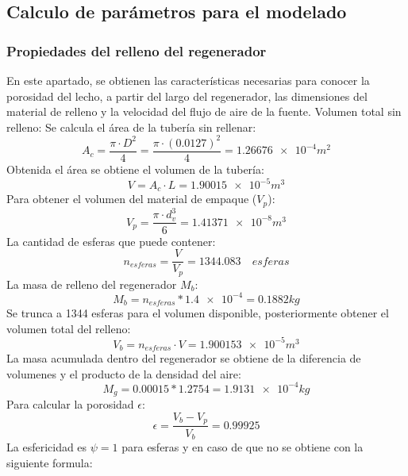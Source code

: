 \documentclass[12pt,letterpaper,final]{article}%
\begin{document}
\subsection{Calculo de parámetros para el modelado}
\subsubsection{Propiedades del relleno del regenerador}
En este apartado, se obtienen las características necesarias para conocer la porosidad del lecho, a partir del largo del regenerador,  las dimensiones del material de relleno y la velocidad del flujo de aire de la fuente. 
 \newline
 Volumen total sin relleno:
 Se calcula el área de la tubería sin rellenar:
 \begin{equation*}
 	A_c= \frac{\pi \cdot D^2}{4} = \frac{\pi \cdot (0.0127)^2}{4} =\num{1.26676e-4} m^2
 \end{equation*}
 Obtenida el área se obtiene el volumen de la tubería:
 \begin{equation*}
 	V=A_c \cdot L = \num{1.90015e-5} m^3
 \end{equation*}
Para obtener el volumen del material de empaque ($V_p$):
\begin{equation*}
	V_p= \frac{\pi \cdot d_v^3}{6} = \num{1.41371e-8} m^3
\end{equation*}
La cantidad de esferas que puede contener:
\begin{equation*}
	n_{esferas}= \frac{V}{V_p} = 1344.083 \quad esferas
\end{equation*}
La masa de relleno del regenerador $M_b$:
\begin{equation*}
	M_{b}= n_{esferas}*\num{1.4e-4} = 0.1882 kg 
\end{equation*}
Se trunca a 1344 esferas para el volumen disponible, posteriormente obtener el volumen total del relleno:
\begin{equation*}
	V_b= n_{esferas} \cdot V = \num{1.900153e-5} m^3
\end{equation*}
La masa acumulada dentro del regenerador se obtiene de la diferencia de volumenes y el producto de la densidad del aire:
\begin{equation*}
	M_g = 0.00015 * 1.2754 = \num{1.9131e-4} kg
\end{equation*}
Para calcular la porosidad $\epsilon$:
\begin{equation*}
	\epsilon = \frac{V_b-V_p}{V_b} = 0.99925
\end{equation*}
La esfericidad es $\psi = 1$ para esferas y en caso de que no se obtiene con la siguiente formula:
\end{document}
